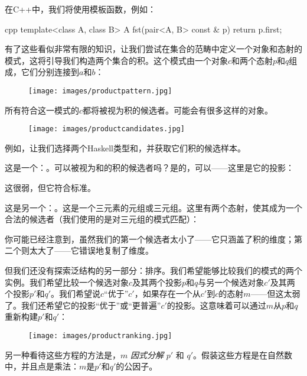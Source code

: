 在C++中，我们将使用模板函数，例如：

\begin{snip}{cpp}
  template<class A, class B> A
  fst(pair<A, B> const & p) {
    return p.first;
  }
\end{snip}
有了这些看似非常有限的知识，让我们尝试在集合的范畴中定义一个对象和态射的模式，这将引导我们构造两个集合的积。这个模式由一个对象$c$和两个态射$p$和$q$组成，它们分别连接到$a$和$b$：


\begin{figure}[H]
  \centering
  \texttt{[image: images/productpattern.jpg]}
\end{figure}

\noindent
所有符合这一模式的$c$都将被视为积的候选者。可能会有很多这样的对象。

\begin{figure}[H]
  \centering
  \texttt{[image: images/productcandidates.jpg]}
\end{figure}

\noindent
例如，让我们选择两个Haskell类型和，并获取它们积的候选样本。

这是一个：。可以被视为和的积的候选者吗？是的，可以——这里是它的投影：

这很弱，但它符合标准。

这是另一个：。这是一个三元素的元组或三元组。这里有两个态射，使其成为一个合法的候选者（我们使用的是对三元组的模式匹配）：

你可能已经注意到，虽然我们的第一个候选者太小了——它只涵盖了积的维度；第二个则太大了——它错误地复制了维度。

但我们还没有探索泛结构的另一部分：排序。我们希望能够比较我们的模式的两个实例。我们希望比较一个候选对象$c$及其两个投影$p$和$q$与另一个候选对象$c'$及其两个投影$p'$和$q'$。我们希望说$c$“优于”$c'$，如果存在一个从$c'$到$c$的态射$m$——但这太弱了。我们还希望它的投影“优于”或“更普遍”$c'$的投影。这意味着可以通过$m$从$p$和$q$重新构建$p'$和$q'$：


\begin{figure}[H]
  \centering
  \texttt{[image: images/productranking.jpg]}
\end{figure}

\noindent
另一种看待这些方程的方法是，$m$ \emph{因式分解} $p'$ 和 $q'$。假装这些方程是在自然数中，并且点是乘法：$m$是$p'$和$q'$的公因子。

